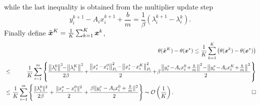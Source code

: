 \documentclass{mcom-l}
\theoremstyle{definition}
\theoremstyle{remark}
\numberwithin{equation}{section}
\begin{document}
while the last inequality is obtained from the multiplier update step
$$y_i^{k+1} - A_i x_i^{k+1} + \frac{b}{m} = \frac{1}{\beta}(\lambda_i^{k+1} - \lambda_i^k).$$
Finally define $\tilde{{\mbox{\boldmath $x$}}}^K = \frac{1}{K} \sum_{k=1}^K {{\mbox{\boldmath $x$}}}^k$,
{\footnotesize\begin{eqnarray}
&&\!\!\!\!\theta(\tilde{{\mbox{\boldmath $x$}}}^K) - \theta({{\mbox{\boldmath $x$}}}^*) \le \frac{1}{K} \sum_{k=1}^K \left( \theta({{\mbox{\boldmath $x$}}}^k) - \theta({{\mbox{\boldmath $x$}}}^*) \right)\nonumber\\
&\le&\!\!\!\! \frac{1}{K} \sum_{i=1}^m \left\{ \frac{\left\|\lambda_i^0\right\|^2 \!\!-\! \left\| \lambda_i^K \right\|^2}{2\beta} \!+\! \frac{\left\|x_i^* \!-\! x_i^0 \right\|_{P_i}^2 \!-\! \left\| x_i^* \!-\! x_i^K \right\|_{P_i}^2}{2} \!+\! \beta\frac{\left\| y_i^* \!-\! A_i x_i^0 \!+\! \frac{b}{m} \right\|^2 \!-\! \left\| y_i^* \!-\! A_i x_i^K \!+\! \frac{b}{m} \right\|^2}{2} \right\}\nonumber\\
&\le&\!\!\!\! \frac{1}{K} \sum_{i=1}^m \left\{ \frac{\|\lambda_i^0\|^2}{2\beta} + \frac{\|x_i^* - x_i^0\|^2}{2} + \frac{\beta \| y_i^* - A_i x_i^0 + \frac{b}{m} \|^2}{2} \right\} \thicksim \mathcal{O}\left(\frac{1}{K}\right).\qquad\qquad\qquad\qquad\qquad\qquad\qquad\square\nonumber
\end{eqnarray}}
\end{document}
